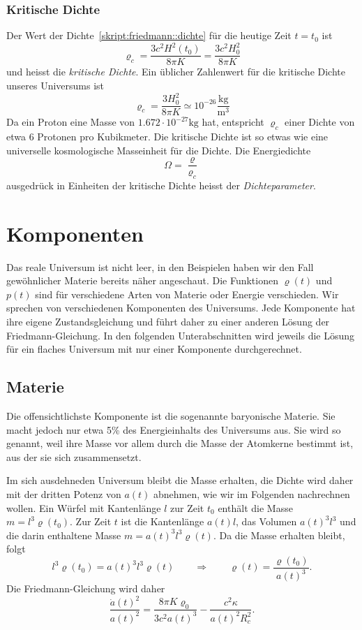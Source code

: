 \subsubsection{Kritische Dichte}
Der Wert der Dichte~\eqref{skript:friedmann::dichte}
für die heutige Zeit $t=t_0$ ist
\[
\varrho_c = \frac{3c^2H^2(t_0)}{8\pi K}=\frac{3c^2H_0^2}{8\pi K}
\]
und heisst die {\em kritische Dichte}.
Ein üblicher Zahlenwert für die kritische Dichte unseres Universums ist
\[
\varrho_c = \frac{3H_0^2}{8\pi K}\simeq 10^{-26}\frac{\text{kg}}{\text{m}^3}
\]
Da ein Proton eine Masse von $1.672\cdot 10^{-27}\text{kg}$ hat, entspricht
$\varrho_c$ einer Dichte von etwa $6$ Protonen pro Kubikmeter.
Die kritische Dichte ist so etwas wie eine universelle kosmologische
Masseinheit für die Dichte.
Die Energiedichte
\[
\Omega=\frac{\varrho}{\varrho_c}
\]
ausgedrück in Einheiten der kritische Dichte heisst
der {\em Dichteparameter}.

\section{Komponenten}
Das reale Universum ist nicht leer, in den Beispielen haben wir den
Fall gewöhnlicher Materie bereits näher angeschaut.
Die Funktionen $\varrho(t)$ und $p(t)$ sind für verschiedene
Arten von Materie oder Energie verschieden.
Wir sprechen von verschiedenen Komponenten des Universums.
Jede Komponente hat ihre eigene Zustandsgleichung und führt
daher zu einer anderen Lösung der Friedmann-Gleichung.
In den folgenden Unterabschnitten wird jeweils die Lösung für
ein flaches Universum mit nur einer Komponente durchgerechnet.

\subsection{Materie}
Die offensichtlichste Komponente ist die sogenannte baryonische Materie.
Sie macht jedoch nur etwa 5\% des Energieinhalts des Universums aus.
Sie wird so genannt, weil ihre Masse vor allem durch die Masse der Atomkerne
bestimmt ist, aus der sie sich zusammensetzt.

Im sich ausdehneden Universum bleibt die Masse erhalten, die Dichte wird
daher mit der dritten Potenz von $a(t)$ abnehmen, wie wir im Folgenden
nachrechnen wollen.
Ein Würfel mit Kantenlänge $l$ zur Zeit $t_0$ enthält die Masse
$m=l^3 \varrho(t_0)$.
Zur Zeit $t$ ist die Kantenlänge $a(t)l$, das Volumen $a(t)^3l^3$
und die darin enthaltene Masse $m=a(t)^3l^3\varrho(t)$.
Da die Masse erhalten bleibt, folgt
\[
l^3 \varrho(t_0)
=
a(t)^3l^3\varrho(t)
\qquad\Rightarrow\qquad
\varrho(t)=\frac{\varrho(t_0)}{a(t)^3}.
\]
Die Friedmann-Gleichung wird daher
\begin{equation}
\frac{\dot a(t)^2}{a(t)^2}
=
\frac{8\pi K\varrho_0}{3c^2a(t)^3}-\frac{c^2\kappa}{a(t)^2R_c^2}.
\end{equation}

